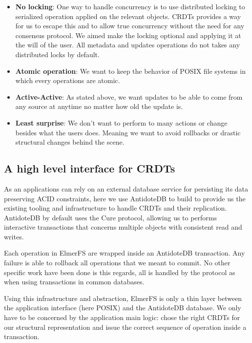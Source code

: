 \documentclass[sigplan, 10pt]{acmart}
\begin{document}
\begin{itemize}
    \item \textbf{No locking}: One way to handle concurrency is to use distributed locking
    to serialized operation applied on the relevant objects. CRDTs provides a way for us to escape
    this and to allow true concurrency without the need for any consensus protocol.
    We aimed make the locking optional and applying it at the will of the user.
    All metadata and updates operations do not takes any distributed
    locks by default.
    \item \textbf{Atomic operation}: We want to keep the behavior of POSIX file systems
    in which every operations are atomic.
    \item \textbf{Active-Active}: As stated above, we want updates to be able to
    come from any source at anytime no matter how old the update is.
    \item \textbf{Least surprise}: We don't want to perform to many actions or change
    besides what the users does. Meaning we want to avoid rollbacks
    or drastic structural changes behind the scene.
\end{itemize}

\subsection{A high level interface for CRDTs}

As an applications can rely on an external database service for persisting its
data preserving ACID constraints, here we use AntidoteDB to build to provide us
the existing tooling and infrastructure to handle CRDTs and their replication.
AntidoteDB by default uses the Cure protocol, allowing us to performs interactive
transactions that concerns multiple objects with consistent read and writes.

Each operation in ElmerFS are wrapped inside an AntidoteDB
transaction. Any failure is able to rollback all operations that we meant to
commit. No other specific work have been done is this regards, all is handled
by the protocol as when using transactions in common databases.

Using this infrastructure and abstraction, ElmerFS is only a thin layer between
the application interface (here POSIX) and the AntidoteDB database. We only
have to be concerned by the application main logic: chose the right
CRDTs for our structural representation and issue the correct
sequence of operation inside a transaction.
\end{document}
